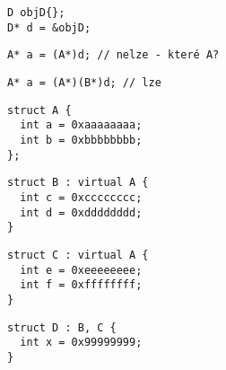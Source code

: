 \begin{frame}[fragile]
\begin{yesblock}
\begin{lstlisting}
D objD{};
D* d = &objD;
\end{lstlisting}
\end{yesblock}

\begin{noblock}
\begin{lstlisting}
A* a = (A*)d; // nelze - které A?
\end{lstlisting}
\end{noblock}

\begin{yesblock}
\begin{lstlisting}
A* a = (A*)(B*)d; // lze
\end{lstlisting}
\end{yesblock}
\end{frame}



\begin{frame}[fragile]
\begin{noteblock}{}
\begin{lstlisting}
struct A {
  int a = 0xaaaaaaaa;
  int b = 0xbbbbbbbb;
};
\end{lstlisting}
\end{noteblock}

\begin{twocols}
\begin{noteblock}{}
\begin{lstlisting}
struct B : virtual A {
  int c = 0xcccccccc;
  int d = 0xdddddddd;
}
\end{lstlisting}
\end{noteblock}
\twocolssep
\begin{noteblock}{}
\begin{lstlisting}
struct C : virtual A {
  int e = 0xeeeeeeee;
  int f = 0xffffffff;
}
\end{lstlisting}
\end{noteblock}
\end{twocols}

\begin{noteblock}{}
\begin{lstlisting}
struct D : B, C {
  int x = 0x99999999;
}
\end{lstlisting}
\end{noteblock}
\end{frame}





